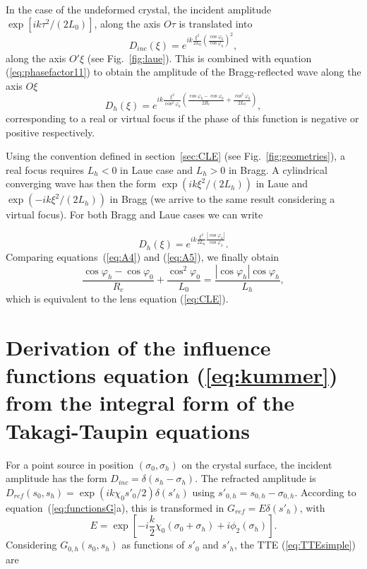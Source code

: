 \documentclass[preprint]{iucr}              %
\begin{document}
In the case of the undeformed crystal, the incident amplitude $\exp[i k \tau^2 / (2L_0)]$, along the axis $O\tau$ 
is translated into 
\begin{equation}
    D_{inc}(\xi) = e^{i k \frac{\xi^2}{2L_0}\left(\frac{\cos\varphi_0}{\cos\varphi_h}\right)^2},
\end{equation}
along the axis $O'\xi$ (see Fig.~\ref{fig:laue}).
This is combined with equation (\ref{eq:phasefactor11}) to obtain the amplitude of the Bragg-reflected wave along the axis $O\xi$
\begin{equation}
\label{eq:A4}
    D_h(\xi) = e^{i k
    \frac{\xi^2}{\cos^2\varphi_h}\left(\frac{\cos\varphi_h-\cos\varphi_0}{2R_c} + \frac{\cos^2\varphi_0}{2L_0}\right)},
\end{equation}
corresponding to a real or virtual focus if the phase of this function is negative or positive respectively. 

Using the convention defined in section~\ref{sec:CLE} (see Fig.~\ref{fig:geometries}), a real focus requires $L_h<0$ in Laue case and $L_h>0$ in Bragg. A cylindrical converging wave has then the form $\exp(i k \xi^2 / (2L_h))$ in Laue and $\exp(-i k \xi^2 / (2L_h))$ in Bragg (we arrive to the same result considering a virtual focus). For both Bragg and Laue cases we can write

\begin{equation}
\label{eq:A5}
D_h(\xi) = e^{i k \frac{\xi^2}{2 L_h}\frac{|\cos\varphi_h|}{\cos\varphi_h}}.   
\end{equation}
 Comparing equations~(\ref{eq:A4}) and (\ref{eq:A5}), we finally obtain
\begin{equation}
    \frac{\cos\varphi_h-\cos\varphi_0}{R_c}+
    \frac{\cos^2\varphi_0}{L_0}=\frac{|\cos\varphi_h|\cos\varphi_h}{L_h},
\end{equation}
which is equivalent to the lens equation (\ref{eq:CLE}).

\section{Derivation of the influence functions equation (\ref{eq:kummer}) from the integral form of the Takagi-Taupin equations}
\label{appendix:TTEintegral}

For a point source in position $(\sigma_0,\sigma_h)$ on the crystal surface, the incident amplitude has the form $D_{inc}= \delta(s_h-\sigma_h)$.
The refracted amplitude is $D_{ref}(s_0,s_h)=\exp(i k \chi_0 s'_0/2)\delta(s'_h)$ using $s'_{0,h}=s_{0,h}-\sigma_{0,h}$.
According to equation~(\ref{eq:functionsG}a), this is transformed in $G_{ref}=E \delta(s'_h)$, with
\begin{equation}
\label{eq:appE}
    E =\exp[-i\frac{k}{2}\chi_0(\sigma_0+\sigma_h)+i \phi_2(\sigma_h)].
\end{equation}
Considering $G_{0,h}(s_0,s_h)$  as functions of $s'_0$ and $s'_h$, the TTE (\ref{eq:TTEsimple}) are
\end{document}
